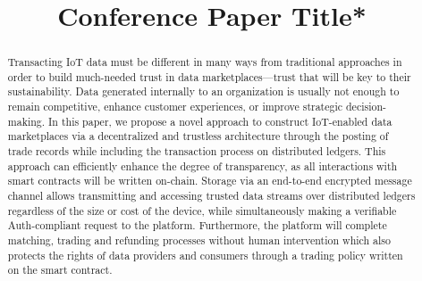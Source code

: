 \documentclass[conference]{IEEEtran}
\begin{document}
\title{Conference Paper Title*}



\author{
\and
{}
\and
{}
}

\maketitle

\begin{abstract}
Transacting IoT data must be different in many ways from traditional approaches in order to build much-needed trust in data marketplaces—trust that will be key to their sustainability. Data generated internally to an organization is usually not enough to remain competitive, enhance customer experiences, or improve strategic decision-making. In this paper, we propose a novel approach to construct IoT-enabled data marketplaces via a decentralized and trustless architecture through the posting of trade records while including the transaction process on distributed ledgers. This approach can efficiently enhance the degree of transparency, as all interactions with smart contracts will be written on-chain. Storage via an end-to-end encrypted message channel allows transmitting and accessing trusted data streams over distributed ledgers regardless of the size or cost of the device, while simultaneously making a verifiable Auth-compliant request to the platform. Furthermore, the platform will complete matching, trading and refunding processes without human intervention which also protects the rights of data providers and consumers through a trading policy written on the smart contract.
\end{abstract}
\end{document}
